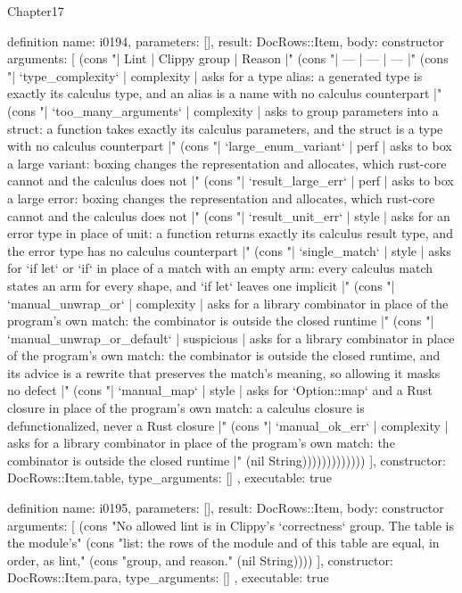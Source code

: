 \begin{lexlean}{Chapter17}
\begin{semanticmodule}
definition{
  name: i0194,
  parameters: [],
  result: DocRows::Item,
  body: constructor{
    arguments: [
      (cons "| Lint | Clippy group | Reason |" (cons "| --- | --- | --- |" (cons "| `type_complexity` | complexity | asks for a type alias: a generated type is exactly its calculus type, and an alias is a name with no calculus counterpart |" (cons "| `too_many_arguments` | complexity | asks to group parameters into a struct: a function takes exactly its calculus parameters, and the struct is a type with no calculus counterpart |" (cons "| `large_enum_variant` | perf | asks to box a large variant: boxing changes the representation and allocates, which rust-core cannot and the calculus does not |" (cons "| `result_large_err` | perf | asks to box a large error: boxing changes the representation and allocates, which rust-core cannot and the calculus does not |" (cons "| `result_unit_err` | style | asks for an error type in place of unit: a function returns exactly its calculus result type, and the error type has no calculus counterpart |" (cons "| `single_match` | style | asks for `if let` or `if` in place of a match with an empty arm: every calculus match states an arm for every shape, and `if let` leaves one implicit |" (cons "| `manual_unwrap_or` | complexity | asks for a library combinator in place of the program's own match: the combinator is outside the closed runtime |" (cons "| `manual_unwrap_or_default` | suspicious | asks for a library combinator in place of the program's own match: the combinator is outside the closed runtime, and its advice is a rewrite that preserves the match's meaning, so allowing it masks no defect |" (cons "| `manual_map` | style | asks for `Option::map` and a Rust closure in place of the program's own match: a calculus closure is defunctionalized, never a Rust closure |" (cons "| `manual_ok_err` | complexity | asks for a library combinator in place of the program's own match: the combinator is outside the closed runtime |" (nil String)))))))))))))
    ],
    constructor: DocRows::Item.table,
    type_arguments: []
  },
  executable: true
}

definition{
  name: i0195,
  parameters: [],
  result: DocRows::Item,
  body: constructor{
    arguments: [
      (cons "No allowed lint is in Clippy's `correctness` group. The table is the module's" (cons "list: the rows of the module and of this table are equal, in order, as lint," (cons "group, and reason." (nil String))))
    ],
    constructor: DocRows::Item.para,
    type_arguments: []
  },
  executable: true
}


\end{semanticmodule}
\end{lexlean}
